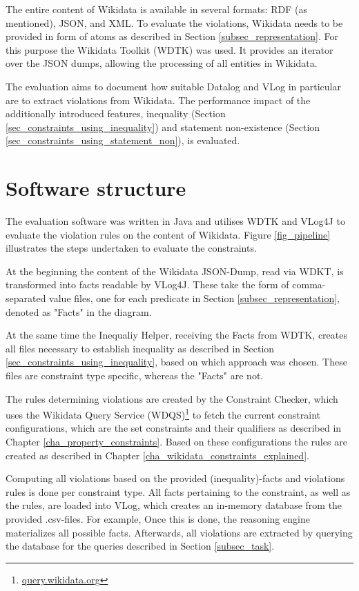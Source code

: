 \documentclass[hyperref,bachelorofscience,fleqn]{cgvpub}
\begin{document}
The entire content of Wikidata is available in several formats: RDF (as mentioned), JSON, and XML. To evaluate the violations, Wikidata needs to be provided in form of atoms as described in 
Section \ref{subsec_representation}. For this purpose the Wikidata Toolkit (WDTK)\cite{wdtk} was used. It provides an iterator over the JSON dumps, allowing the processing of all entities in Wikidata.

The evaluation aims to document how suitable Datalog and VLog in particular are to extract violations from Wikidata. The performance impact of the additionally introduced features, inequality (Section \ref{sec_constraints_using_inequality}) and statement non-existence (Section \ref{sec_constraints_using_statement_non}), is evaluated.

\section{Software structure}
The evaluation software\cite{wcd} was written in Java and utilises WDTK and VLog4J to evaluate the violation rules on the content of Wikidata. Figure \ref{fig_pipeline} illustrates the steps undertaken to evaluate the constraints.

At the beginning the content of the Wikidata JSON-Dump, read via WDKT, is transformed into facts readable by VLog4J. These take the form of comma-separated value files, one for each predicate in Section \ref{subsec_representation}, denoted as "Facts" in the diagram.

At the same time the Inequaliy Helper, receiving the Facts from WDTK, creates all files necessary to establish inequality as described in Section \ref{sec_constraints_using_inequality}, based on which approach was chosen. These files are constraint type specific, whereas the "Facts" are not.

The rules determining violations are created by the Constraint Checker, which uses the Wikidata Query Service (WDQS)\footnote{\url{query.wikidata.org}} to fetch the current constraint configurations, which are the set constraints and their qualifiers as described in Chapter \ref{cha_property_constraints}. Based on these configurations the rules are created as described in Chapter \ref{cha_wikidata_constraints_explained}.

Computing all violations based on the provided (inequality)-facts and violations rules is done per constraint type. All facts pertaining to the constraint, as well as the rules, are loaded into VLog, which creates an in-memory database from the provided .csv-files. For example, Once this is done, the reasoning engine materializes all possible facts. Afterwards, all violations are extracted by querying the database for the queries described in Section \ref{subsec_task}.
\end{document}
